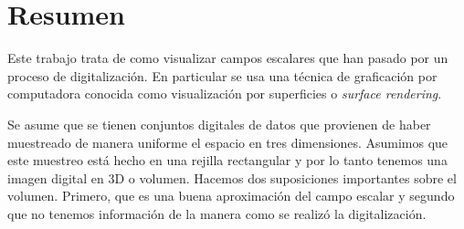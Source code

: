 \chapter*{Resumen}
Este trabajo trata de como visualizar campos escalares que han pasado por un proceso de digitalización.
En particular se usa una técnica de graficación por computadora conocida como visualización por superficies o \emph{surface rendering}.

Se asume que se tienen conjuntos digitales de datos que provienen de haber muestreado de manera uniforme el espacio en tres dimensiones.
Asumimos que este muestreo está hecho en una rejilla rectangular y por lo tanto tenemos una imagen digital en 3D o volumen.
Hacemos dos suposiciones importantes sobre el volumen.
Primero, que es una buena aproximación del campo escalar y segundo que no tenemos información de la manera como se realizó la digitalización.
